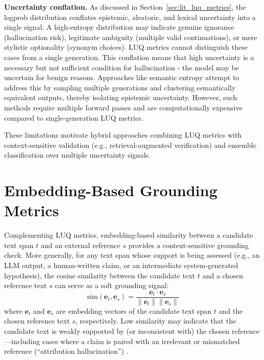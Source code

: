 \noindent\textbf{Uncertainty conflation.} As discussed in Section~\ref{sec:lit_luq_metrics}, the logprob distribution conflates epistemic, aleatoric, and lexical uncertainty into a single signal. A high-entropy distribution may indicate genuine ignorance (hallucination risk), legitimate ambiguity (multiple valid continuations), or mere stylistic optionality (synonym choices). LUQ metrics cannot distinguish these cases from a single generation. This conflation means that high uncertainty is a necessary but not sufficient condition for hallucination - the model may be uncertain for benign reasons. Approaches like semantic entropy \citep{farquhar2024detecting} attempt to address this by sampling multiple generations and clustering semantically equivalent outputs, thereby isolating epistemic uncertainty. However, such methods require multiple forward passes and are computationally expensive compared to single-generation LUQ metrics.

These limitations motivate hybrid approaches combining LUQ metrics with context-sensitive validation (e.g., retrieval-augmented verification) and ensemble classification over multiple uncertainty signals.

\section{Embedding-Based Grounding Metrics}
\label{sec:lit_embedding_grounding}

Complementing LUQ metrics, embedding-based similarity between a candidate text span $t$ and an external reference $s$ provides a context-sensitive grounding check. More generally, for any text span whose support is being assessed (e.g., an LLM output, a human-written claim, or an intermediate system-generated hypothesis), the cosine similarity between the candidate text $t$ and a chosen reference text $s$ can serve as a soft grounding signal:
\begin{equation}
\text{sim}(\mathbf{e}_{t}, \mathbf{e}_{s}) = \frac{\mathbf{e}_{t} \cdot \mathbf{e}_{s}}{\|\mathbf{e}_{t}\| \|\mathbf{e}_{s}\|}
\end{equation}
where $\mathbf{e}_{t}$ and $\mathbf{e}_{s}$ are embedding vectors of the candidate text span $t$ and the chosen reference text $s$, respectively. Low similarity may indicate that the candidate text is weakly supported by (or inconsistent with) the chosen reference---including cases where a claim is paired with an irrelevant or mismatched reference (``attribution hallucination'') \citep{tonmoy2024comprehensive,batista2025safeimprovingllmsystems}.

